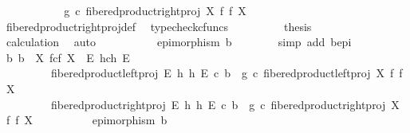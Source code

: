 \begin{isabellebody}
\ \ \ \ \ \ \isamarkupfalse%
\ \isamarkupfalse%
\ {\isachardoublequoteopen}{\isachardot}{\kern0pt}{\isachardot}{\kern0pt}{\isachardot}{\kern0pt}\ {\isacharequal}{\kern0pt}\ g\ {\isasymcirc}\isactrlsub c\ fibered{\isacharunderscore}{\kern0pt}product{\isacharunderscore}{\kern0pt}right{\isacharunderscore}{\kern0pt}proj\ X\ f\ f\ X{\isachardoublequoteclose}\isanewline
\ \ \ \ \ \ \ \ \isamarkupfalse%
\ fibered{\isacharunderscore}{\kern0pt}product{\isacharunderscore}{\kern0pt}right{\isacharunderscore}{\kern0pt}proj{\isacharunderscore}{\kern0pt}def\ \isamarkupfalse%
\ {\isacharparenleft}{\kern0pt}typecheck{\isacharunderscore}{\kern0pt}cfuncs{\isacharparenright}{\kern0pt}\isanewline
\ \ \ \ \ \ \isamarkupfalse%
\ \isamarkupfalse%
\ {\isacharquery}{\kern0pt}thesis\isanewline
\ \ \ \ \ \ \ \ \isamarkupfalse%
\ calculation\ \isamarkupfalse%
\ auto\isanewline
\ \ \ \ \isamarkupfalse%
\isanewline
\ \ \ \ \isamarkupfalse%
\ {\isachardoublequoteopen}epimorphism\ b{\isachardoublequoteclose}\isanewline
\ \ \ \ \ \ \isamarkupfalse%
\ {\isacharparenleft}{\kern0pt}simp\ add{\isacharcolon}{\kern0pt}\ b{\isacharunderscore}{\kern0pt}epi{\isacharparenright}{\kern0pt}\isanewline
\ \ \isamarkupfalse%
\ \ \isanewline
\ \ \isamarkupfalse%
\ {\isachardoublequoteopen}{\isasymexists}{\isacharbang}{\kern0pt}b{\isachardot}{\kern0pt}\ b\ {\isacharcolon}{\kern0pt}\ X\ \isactrlbsub f\isactrlesub {\isasymtimes}\isactrlsub c\isactrlbsub f\isactrlesub \ X\ {\isasymrightarrow}\ E\ \isactrlbsub h\isactrlesub {\isasymtimes}\isactrlsub c\isactrlbsub h\isactrlesub \ E\ {\isasymand}\isanewline
\ \ \ \ \ \ \ \ \ fibered{\isacharunderscore}{\kern0pt}product{\isacharunderscore}{\kern0pt}left{\isacharunderscore}{\kern0pt}proj\ E\ h\ h\ E\ {\isasymcirc}\isactrlsub c\ b\ {\isacharequal}{\kern0pt}\ g\ {\isasymcirc}\isactrlsub c\ fibered{\isacharunderscore}{\kern0pt}product{\isacharunderscore}{\kern0pt}left{\isacharunderscore}{\kern0pt}proj\ X\ f\ f\ X\ {\isasymand}\isanewline
\ \ \ \ \ \ \ \ \ fibered{\isacharunderscore}{\kern0pt}product{\isacharunderscore}{\kern0pt}right{\isacharunderscore}{\kern0pt}proj\ E\ h\ h\ E\ {\isasymcirc}\isactrlsub c\ b\ {\isacharequal}{\kern0pt}\ g\ {\isasymcirc}\isactrlsub c\ fibered{\isacharunderscore}{\kern0pt}product{\isacharunderscore}{\kern0pt}right{\isacharunderscore}{\kern0pt}proj\ X\ f\ f\ X\ {\isasymand}\isanewline
\ \ \ \ \ \ \ \ \ epimorphism\ b{\isachardoublequoteclose}\isanewline

\end{isabellebody}
